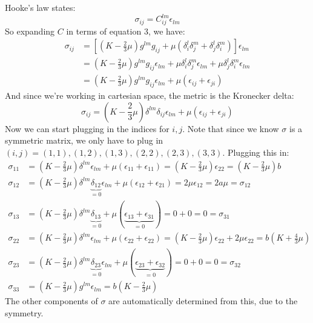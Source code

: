 \documentclass{article}
\begin{document}
\begin{solution}
	Hooke's law states:
	\[
		\sigma_{ij} = C^{lm}_{ij} \epsilon_{lm}
	\] 
	So expanding $C$ in terms of equation 3, we have:
	\begin{align*}
		\sigma_{ij} &= \left[\left(K - \frac{2}{3}\mu\right) g^{lm}g_{ij} + \mu(\delta^l_i \delta^m_j + \delta^l_j\delta^m_i)\right]\epsilon_{lm}\\
					&= \left( K - \frac{2}{3}\mu \right) g^{lm}g_{ij}\epsilon_{lm} + \mu\delta^l_i\delta^m_j \epsilon_{lm} + \mu \delta^l_j \delta^m_i \epsilon_{lm}	\\
					&= \left( K - \frac{2}{3}\mu \right) g^{lm} g_{ij} \epsilon_{lm}+ \mu(\epsilon_{ij} + \epsilon_{ji}) 
	\end{align*}
	And since we're working in cartesian space, the metric is the Kronecker delta:
	\[
		\sigma_{ij} = \left( K - \frac{2}{3}\mu \right) \delta^{lm}\delta_{ij}\epsilon_{lm} + \mu(\epsilon_{ij} + \epsilon_{ji})
	\] 
	Now we can start plugging in the indices for $i, j$. Note that since we know $\sigma$ is a symmetric matrix, 
	we only have to plug in $(i, j) = (1, 1), (1, 2), (1, 3), (2, 2), (2, 3), (3, 3)$. Plugging this in:
	\begin{align*}
		\sigma_{11} &= \left( K - \frac{2}{3}\mu \right) \delta^{lm}\epsilon_{lm} + \mu(\epsilon_{11} + \epsilon_{11}) = \left( K - \frac{2}{3}\mu \right) \epsilon_{22} = \left( K - \frac{2}{3}\mu \right) b\\
		\sigma_{12} &= \left( K - \frac{2}{3}\mu \right) \delta^{lm} \underbrace{\delta_{12}}_{= 0} \epsilon_{lm} + \mu(\epsilon_{12} + \epsilon_{21}) = 2 \mu \epsilon_{12} = 2a \mu = \sigma_{12} \\
		\sigma_{13} &= \left( K - \frac{2}{3} \mu\right) \delta^{lm} \underbrace{\delta_{13}}_{=0} + \mu(\underbrace{\epsilon_{13} + \epsilon_{31}}_{=0}) = 0 + 0 = 0= \sigma_{31} \\
		\sigma_{22} &= \left( K - \frac{2}{3}\mu \right) \delta^{lm} \epsilon_{lm} + \mu(\epsilon_{22} + \epsilon_{22}) = \left( K - \frac{2}{3}\mu \right) \epsilon_{22} + 2 \mu \epsilon_{22} = b\left( K + \frac{4}{3}\mu \right) \\
		\sigma_{23} &= \left( K - \frac{2}{3}\mu \right) \delta^{lm} \underbrace{\delta_{23}}_{=0} \epsilon_{lm} + \mu(\underbrace{\epsilon_{23} + \epsilon_{32}}_{ = 0}) = 0 + 0 = 0 = \sigma_{32} \\
		\sigma_{33} &= \left( K - \frac{2}{3}\mu \right) g^{lm} \epsilon_{lm} = b\left( K - \frac{2}{3}\mu \right) 
	\end{align*}
	The other components of $\sigma$ are automatically determined from this, due to the symmetry. 
\end{solution}
\bigskip
\dphline
\pagebreak
\end{document}
